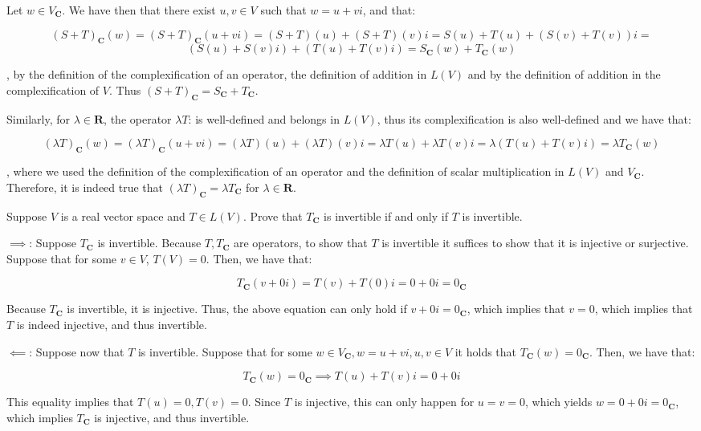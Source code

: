 \begin{solution}

    Let $w \in V_\mathbf{C}$. We have then that there exist $u, v \in V$ such that $w = u + vi$, and that:
    
    $$(S+T)_\mathbf{C}(w) = (S+T)_\mathbf{C}(u + vi) = (S+T)(u) + (S+T)(v)i = S(u) + T(u) + (S(v) + T(v))i = $$
    $$(S(u) + S(v)i) + (T(u) + T(v)i) = S_\mathbf{C}(w) + T_\mathbf{C}(w)$$

    , by the definition of the complexification of an operator, the definition of addition in $L(V)$ and by the definition of addition in the complexification of $V$. Thus $(S+T)_\mathbf{C} = S_\mathbf{C} + T_\mathbf{C}$.

    Similarly, for $\lambda \in \mathbf{R}$, the operator $\lambda T$: is well-defined and belongs in $L(V)$, thus its complexification is also well-defined and we have that:
    
    $$(\lambda T)_\mathbf{C}(w) = (\lambda T)_\mathbf{C}(u+vi) = (\lambda T)(u) + (\lambda T)(v)i = \lambda T(u) + \lambda T(v)i = \lambda(T(u) + T(v)i) = \lambda T_\mathbf{C}(w)$$

    , where we used the definition of the complexification of an operator and the definition of scalar multiplication in $L(V)$ and $V_\mathbf{C}$. Therefore, it is indeed true that $(\lambda T)_\mathbf{C} = \lambda T_\mathbf{C}$ for $\lambda \in \mathbf{R}$.
\end{solution}

\begin{exercise}{6}
    Suppose $V$ is a real vector space and $T \in L(V)$. Prove that $T_\mathbf{C}$ is invertible if and only if $T$ is invertible.
\end{exercise}

\begin{solution}

    $\implies$: Suppose $T_\mathbf{C}$ is invertible. Because $T, T_\mathbf{C}$ are operators, to show that $T$ is invertible it suffices to show that it is injective or surjective. Suppose that for some $v \in V$, $T(V) = 0$. Then, we have that:

    $$T_\mathbf{C}(v + 0i) = T(v) + T(0)i = 0 + 0i = 0_\mathbf{C}$$

    Because $T_\mathbf{C}$ is invertible, it is injective. Thus, the above equation can only hold if $v + 0i = 0_\mathbf{C}$, which implies that $v = 0$, which implies that $T$ is indeed injective, and thus invertible.

    $\impliedby$: Suppose now that $T$ is invertible. Suppose that for some $w \in V_\mathbf{C}, w = u + vi, u, v \in V$ it holds that $T_\mathbf{C}(w) = 0_\mathbf{C}$. Then, we have that:

    $$T_\mathbf{C}(w) = 0_\mathbf{C} \implies T(u) + T(v)i = 0 + 0i$$

    This equality implies that $T(u) = 0, T(v) = 0$. Since $T$ is injective, this can only happen for $u = v = 0$, which yields $w = 0+0 i = 0_\mathbf{C}$, which implies $T_\mathbf{C}$ is injective, and thus invertible.
\end{solution}

